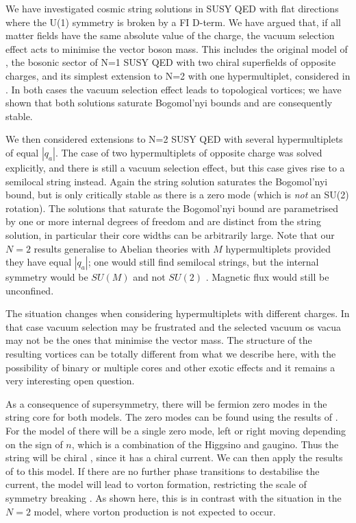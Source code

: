 \documentclass[a4paper,aps,prd,superscriptaddress,floats]{revtex4}
\begin{document}
We have investigated cosmic string solutions in SUSY QED
 with flat directions where the U(1) symmetry is broken by a
FI D-term.  We have argued that, if all
matter fields have the same absolute value of the charge, the vacuum
selection effect acts to minimise the vector
boson mass.  This includes the original model of
\cite{PRTT96}, the bosonic sector of N=1 SUSY QED with two
chiral superfields of opposite charges, and its simplest extension to
N=2 with one hypermultiplet, considered in \cite{hou}. In both cases
the vacuum selection effect leads to topological vortices; we have
shown that both solutions saturate Bogomol'nyi bounds and are
consequently stable.

We then considered extensions to N=2 SUSY QED with several
hypermultiplets of equal $|q_a|$. The case of two hypermultiplets of
opposite charge was solved explicitly, and there is still a vacuum selection
effect, but this case gives rise to a semilocal string  instead. Again
the string solution saturates the Bogomol'nyi bound, but is only 
critically stable as there is a zero mode (which is {\textit {not}} an SU(2) rotation). 
The solutions that saturate 
the Bogomol'nyi bound are parametrised by one or more internal 
degrees of freedom and are distinct from the string solution, 
in particular their core widths can be arbitrarily large. 
Note that our $N=2$ results generalise to Abelian theories with $M$  
hypermultiplets provided they have equal $|q_a|$; one would still find
 semilocal strings, but the internal symmetry would be $SU(M)$ 
and not $SU(2)$ \cite{m93}. Magnetic flux would still be unconfined. 

The situation changes when considering hypermultiplets with different charges. In that case vacuum selection may be frustrated and the selected vacuum os vacua may not be the ones that minimise the vector mass. The structure of the resulting vortices can be totally different from what we describe here, with the possibility of binary or multiple cores and other exotic effects and it remains a very interesting open question. 

As a consequence of supersymmetry, there will be fermion zero
modes in the string core for both models.  The zero modes can be found
using the results of \cite{DDT97}.  For the model of \cite{PRTT96}
there will be a single zero mode, left or right moving depending on
the sign of $n$, which is a combination of the Higgsino and
gaugino. Thus the string will be chiral \cite{chiralstring}, since it
has a chiral current. We can then apply the results of
\cite{chiralvorton} to this model.  If there are no further phase
transitions to destabilise the current, the model will lead to vorton
formation, restricting the scale of symmetry breaking
\cite{chiralvorton}.  As shown here, this is in contrast with the
situation in the $N\!=\!2$ model, where vorton production is not expected
to occur.
\end{document}
